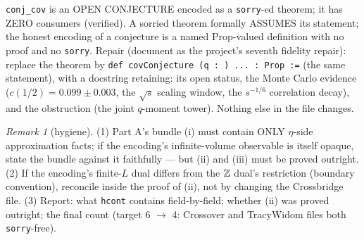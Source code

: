 \documentclass[11pt]{article}
\theoremstyle{plain}
\theoremstyle{remark}
\newtheorem{remark}{Remark}
\begin{document}
\texttt{conj\_cov} is an OPEN CONJECTURE encoded as a \texttt{sorry}-ed
theorem; it has ZERO consumers (verified). A sorried theorem formally
ASSUMES its statement; the honest encoding of a conjecture is a named
$\mathrm{Prop}$-valued definition with no proof and no \texttt{sorry}.
Repair (document as the project's seventh fidelity repair): replace the
theorem by
\texttt{def covConjecture (q :\ \R)\ ...\ :\ Prop :=} (the same statement),
with a docstring retaining: its open status, the Monte Carlo evidence
($c(1/2)=0.099\pm0.003$, the $\sqrt s$ scaling window, the $s^{-1/6}$
correlation decay), and the obstruction (the joint $q$-moment tower). Nothing
else in the file changes.

\begin{remark}[hygiene]
(1) Part A's bundle (i) must contain ONLY $\eta$-side approximation facts;
if the encoding's infinite-volume observable is itself opaque, state the
bundle against it faithfully --- but (ii) and (iii) must be proved outright.
(2) If the encoding's finite-$L$ dual differs from the $\mathbb{Z}$ dual's
restriction (boundary convention), reconcile inside the proof of (ii), not by
changing the Crossbridge file.
(3) Report: what \texttt{hcont} contains field-by-field; whether (ii) was
proved outright; the final count (target 6 $\to$ 4: Crossover and TracyWidom
files both \texttt{sorry}-free).
\end{remark}
\end{document}
